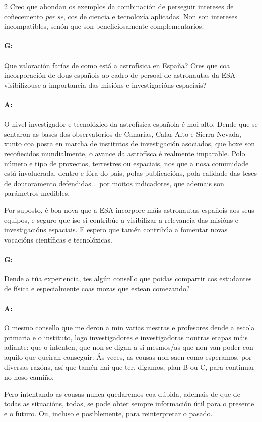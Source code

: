 \begin{multicols}{2}
Creo que abondan os exemplos da combinación de perseguir intereses de
coñecemento \textit{per se}, cos de ciencia e tecnoloxía aplicadas. Non son
intereses incompatibles, senón que son beneficiosamente complementarios.

\paragraph{G:} Que valoración farías de como está a astrofísica en España? Cres
que coa incorporación de dous españois ao cadro de persoal de astronautas da
ESA visibilizouse a importancia das misións e investigacións espaciais?

\paragraph{A:} O nivel investigador e tecnolóxico da astrofísica española é moi
alto. Dende que se sentaron as bases dos observatorios de Canarias, Calar Alto
e Sierra Nevada, xunto coa posta en marcha de institutos de investigación
asociados, que hoxe son recoñecidos mundialmente, o avance da astrofísca é
realmente imparable. Polo número e tipo de proxectos, terrestres ou espaciais,
nos que a nosa comunidade está involucrada, dentro e fóra do país, polas
publicacións, pola calidade das teses de doutoramento defendidas... por moitos
indicadores, que ademais son parámetros medibles.

Por suposto, é boa nova que a ESA incorpore máis astronautas españois aos seus
equipos, e seguro que iso si contribúe a visibilizar a relevancia das misións e
investigacións espaciais. E espero que tamén contribúa a fomentar novas
vocacións científicas e tecnolóxicas.

\paragraph{G:} Dende a túa experiencia, tes algún consello que poidas compartir
cos estudantes de física e especialmente coas mozas que estean comezando?

\paragraph{A:} O mesmo consello que me deron a min varias mestras e profesores
dende a escola primaria e o instituto, logo investigadores e investigadoras
noutras etapas máis adiante: que o intenten, que non se digan a si mesmos/as
que non van poder con aquilo que queiran conseguir. Ás veces, as cousas non
saen como esperamos, por diversas razóns, así que tamén hai que ter, digamos,
plan B ou C, para continuar no noso camiño.

Pero intentando as cousas nunca quedaremos coa dúbida, ademais de que de todas
as situacións, todas, se pode obter sempre información útil para o presente e o
futuro. Ou, incluso e posiblemente, para reinterpretar o pasado.

\end{multicols}

